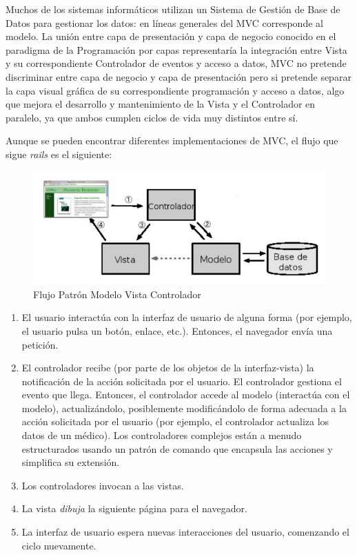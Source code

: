 			Muchos de los sistemas informáticos utilizan un Sistema de Gestión de Base de Datos para gestionar los datos: en líneas generales del MVC corresponde al modelo. La unión entre capa de presentación y capa de negocio conocido en el paradigma de la Programación por capas representaría la integración entre Vista y su correspondiente Controlador de eventos y acceso a datos, MVC no pretende discriminar entre capa de negocio y capa de presentación pero si pretende separar la capa visual gráfica de su correspondiente programación y acceso a datos, algo que mejora el desarrollo y mantenimiento de la Vista y el Controlador en paralelo, ya que ambos cumplen ciclos de vida muy distintos entre sí.

			Aunque se pueden encontrar diferentes implementaciones de MVC, el flujo que sigue \textit{rails} es el siguiente:

			\begin{figure}[H]
			  \centering
			    \includegraphics[width=16cm]{img/png/mvc.png}
			  \caption{Flujo Patrón Modelo Vista Controlador}
			  \label{fig:patron_mvc}
			\end{figure}

			\begin{enumerate}
				\item El usuario interactúa con la interfaz de usuario de alguna forma (por ejemplo, el usuario pulsa un botón, enlace, etc.). Entonces, el navegador envía una petición.
				\item El controlador recibe (por parte de los objetos de la interfaz-vista) la notificación de la acción solicitada por el usuario. El controlador gestiona el evento que llega. Entonces, el controlador accede al modelo (interactúa con el modelo), actualizándolo, posiblemente modificándolo de forma adecuada a la acción solicitada por el usuario (por ejemplo, el controlador actualiza los datos de un médico). Los controladores complejos están a menudo estructurados usando un patrón de comando que encapsula las acciones y simplifica su extensión.
				\item Los controladores invocan a las vistas.
				\item La vista \textit{dibuja} la siguiente página para el navegador.
				\item La interfaz de usuario espera nuevas interacciones del usuario, comenzando el ciclo nuevamente.
			\end{enumerate}

